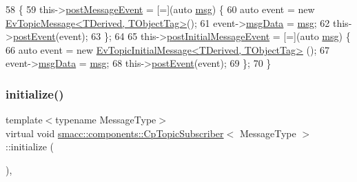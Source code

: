 \begin{DoxyCode}
58     \{
59         this->\hyperlink{classsmacc_1_1components_1_1CpTopicSubscriber_a002ca59f74f784f14597d1c0e057d298}{postMessageEvent} = [=](\textcolor{keyword}{auto} \hyperlink{namespacebattery__monitor__node_ab1920c64448816edd4064e494275fdff}{msg}) \{
60             \textcolor{keyword}{auto} \textcolor{keyword}{event} = \textcolor{keyword}{new} \hyperlink{structsmacc_1_1default__events_1_1EvTopicMessage}{EvTopicMessage<TDerived, TObjectTag>}();
61             \textcolor{keyword}{event}->\hyperlink{structsmacc_1_1default__events_1_1EvTopicMessage_a82384568b702a0c3a3dc2fbe7eeefea9}{msgData} = \hyperlink{namespacebattery__monitor__node_ab1920c64448816edd4064e494275fdff}{msg};
62             this->\hyperlink{classsmacc_1_1ISmaccComponent_a84455564c2c4b90be58e900050232722}{postEvent}(event);
63         \};
64 
65         this->\hyperlink{classsmacc_1_1components_1_1CpTopicSubscriber_a9e1c210ebc8d5ef0c837e8bd9b83f754}{postInitialMessageEvent} = [=](\textcolor{keyword}{auto} \hyperlink{namespacebattery__monitor__node_ab1920c64448816edd4064e494275fdff}{msg}) \{
66             \textcolor{keyword}{auto} \textcolor{keyword}{event} = \textcolor{keyword}{new} \hyperlink{structsmacc_1_1default__events_1_1EvTopicInitialMessage}{EvTopicInitialMessage<TDerived, TObjectTag>}
      ();
67             \textcolor{keyword}{event}->\hyperlink{structsmacc_1_1default__events_1_1EvTopicInitialMessage_a989c7cf4210c7750806b081bc73112cd}{msgData} = \hyperlink{namespacebattery__monitor__node_ab1920c64448816edd4064e494275fdff}{msg};
68             this->\hyperlink{classsmacc_1_1ISmaccComponent_a84455564c2c4b90be58e900050232722}{postEvent}(event);
69         \};
70     \}
\end{DoxyCode}
\mbox{\label{classsmacc_1_1components_1_1CpTopicSubscriber_a12a86f96d939cfa509181865d6ec85e9}} 
\subsubsection{\texorpdfstring{initialize()}{initialize()}}
{\footnotesize\ttfamily template$<$typename Message\+Type$>$ \\
virtual void \hyperlink{classsmacc_1_1components_1_1CpTopicSubscriber}{smacc\+::components\+::\+Cp\+Topic\+Subscriber}$<$ Message\+Type $>$\+::initialize (\begin{DoxyParamCaption}{ }\end{DoxyParamCaption})\hspace{0.3cm}{\ttfamily [inline]}, {\ttfamily [virtual]}}



